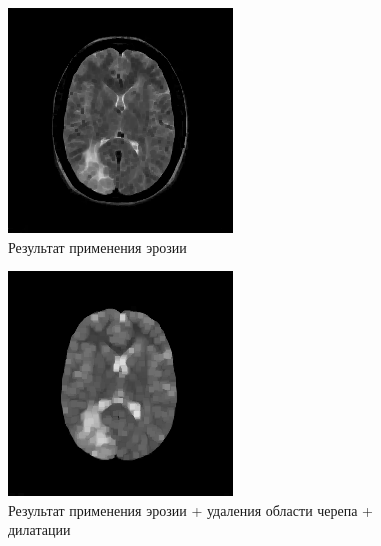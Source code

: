 \begin{figure}[H]
    \includegraphics[width=\textwidth]{../outputs/1_erode.png}
    \caption{Результат применения эрозии}
\end{figure}

\begin{figure}[H]
    \includegraphics[width=\textwidth]{../outputs/1_erode_dilate.png}
    \caption{Результат применения эрозии + удаления области черепа + дилатации}
\end{figure}

